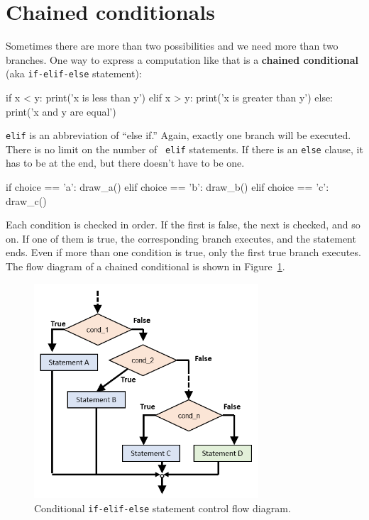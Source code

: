 \section{Chained conditionals}

Sometimes there are more than two possibilities and we need more than
two branches.  One way to express a computation like that is a {\bf
chained conditional} (aka {\tt if-elif-else} statement):

\beforeverb
\begin{pycode}
if x < y:
    print('x is less than y')
elif x > y:
    print('x is greater than y')
else:
    print('x and y are equal')
\end{pycode}
\afterverb
%
{\tt elif} is an abbreviation of ``else if.''  Again, exactly one
branch will be executed.  There is no limit on the number of {\tt
elif} statements.  If there is an {\tt else} clause, it has to be
at the end, but there doesn't have to be one.



\beforeverb
\begin{pycode}
if choice == 'a':
    draw_a()
elif choice == 'b':
    draw_b()
elif choice == 'c':
    draw_c()
\end{pycode}
\afterverb
%
Each condition is checked in order.  If the first is false,
the next is checked, and so on.  If one of them is
true, the corresponding branch executes, and the statement
ends.  Even if more than one condition is true, only the
first true branch executes.  The flow diagram of a chained 
conditional is shown in Figure~\ref{fig:if-elif-statement}.


\begin{figure}[htb]%
\begin{center}
\includegraphics[height=8cm]{figs/ifelifstatementdiagram.png}%
\caption{Conditional {\tt if-elif-else} statement control flow diagram.}%
\label{fig:if-elif-statement}%
\end{center}
\end{figure}


